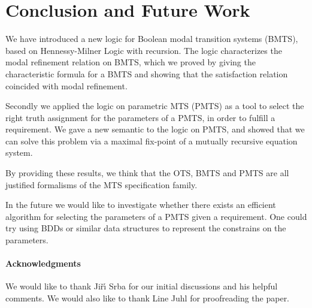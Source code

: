 







\section{Conclusion and Future Work} 
We have introduced a new logic for Boolean modal transition systems (BMTS), based on Hennessy-Milner Logic with recursion. The logic characterizes the modal refinement relation on BMTS, which we proved by giving the characteristic formula for a BMTS and showing that the satisfaction relation coincided with modal refinement. 

Secondly we applied the logic on parametric MTS (PMTS) as a tool to select the right truth assignment for the parameters of a PMTS, in order to fulfill a requirement. We gave a new semantic to the logic on PMTS, and showed that we can solve this problem via a maximal fix-point of a mutually recursive equation system.

By providing these results, we think that the OTS, BMTS and PMTS are all justified formalisms of the MTS specification family.

In the future we would like to investigate whether there exists an efficient algorithm for selecting the parameters of a PMTS given a requirement. One could try using BDDs or similar data structures to represent the constrains on the parameters.

\paragraph{Acknowledgments} We would like to thank Ji\v{r}\'{\i} Srba for our initial discussions and his helpful comments. We would also like to thank Line Juhl for proofreading the paper.